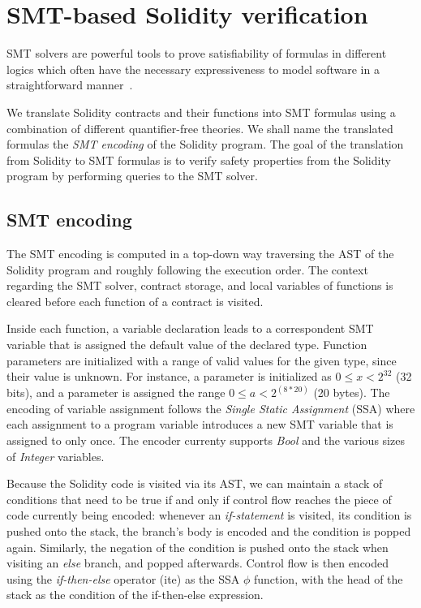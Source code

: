 \section{SMT-based Solidity verification}
\label{section:smt}

SMT solvers are powerful tools to prove satisfiability of formulas in different
logics which often have the necessary expressiveness to model software in a
straightforward manner~\cite{Komuravelli13,Alt17,Donaldson11,Beyer11}.

We translate Solidity contracts and their functions into SMT formulas using a
combination of different quantifier-free theories.
%
We shall name the translated formulas the \emph{SMT encoding} of the Solidity
program.
%
The goal of the translation from Solidity to SMT formulas is to verify safety
properties from the Solidity program by performing queries to the SMT solver.


\subsection{SMT encoding}

The SMT encoding is computed in a top-down way traversing the AST of the
Solidity program and roughly following the execution order.
The context regarding the SMT solver, contract storage, and
local variables of functions is cleared before each function of a contract is
visited.

Inside each function, a variable declaration leads to a correspondent SMT
variable that is assigned the default value of the declared type.
%
Function parameters are initialized with a range of valid values for the given
type, since their value is unknown.  For instance, a parameter 
is initialized as $0 \le x < 2^{32}$ (32 bits), and a parameter  is assigned the range $0 \le a < 2^{(8*20)}$ (20 bytes).
%
The encoding of variable assignment follows the \emph{Single Static Assignment}
(SSA) where each assignment to a program variable introduces a new SMT variable
that is assigned to only once.
%
The encoder currenty supports \emph{Bool} and the various sizes of
\emph{Integer} variables.

Because the Solidity code is visited via its AST, we can maintain a stack of
conditions that need to be true if and only if control flow
reaches the piece of code currently being encoded: whenever an
\emph{if-statement} is visited, its condition is pushed onto the stack, the
branch's body is encoded and the condition is popped again.
%
Similarly, the negation of the condition is pushed onto the stack when visiting
an \emph{else} branch, and popped afterwards.
%
Control flow is then encoded using the \emph{if-then-else} operator (ite) as
the SSA $\phi$ function, with the head of the stack as the condition of the
if-then-else expression.

